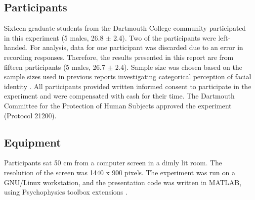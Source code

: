 \documentclass[10pt,letterpaper]{article}
\begin{document}
\bigskip

\subsection*{Participants}
Sixteen graduate students from the Dartmouth College community participated in this experiment (5 males, 26.8 $\pm$ 2.4). Two of the participants were left-handed. For analysis, data for one participant was discarded due to an error in recording responses. Therefore, the results presented in this report are from fifteen participants (5 males, 26.7 $\pm$ 2.4). Sample size was chosen based on the sample sizes used in previous reports investigating categorical perception of facial identity \cite{natu2016development, kaufmann2004expression, jacques2006speed, mckone2014face}. All participants provided written informed consent to participate in the experiment and were compensated with cash for their time. The Dartmouth Committee for the Protection of Human Subjects approved the experiment (Protocol 21200).  

\subsection*{Equipment}
Participants sat 50 cm from a computer screen in a dimly lit room. The resolution of the screen was 1440 x 900 pixels. The experiment was run on a GNU/Linux workstation, and the presentation code was written in MATLAB, using Psychophysics toolbox extensions \cite{brainard1997psychophysics, kleiner2007s}.
\end{document}

